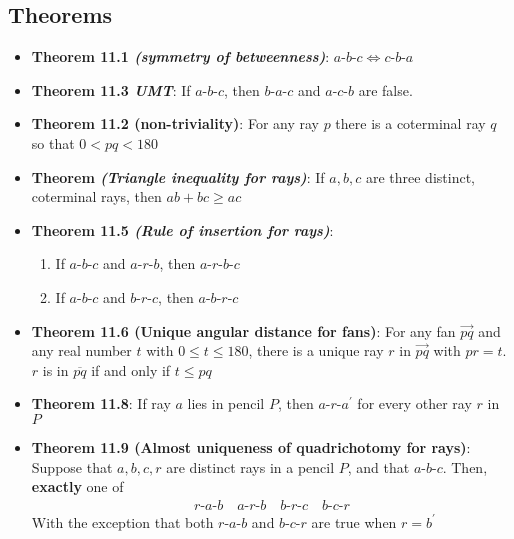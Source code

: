 \documentclass{report}
\begin{document}
    \pagebreak 
    \subsection{Theorems}
    \begin{itemize}
        \item \textbf{Theorem 11.1 \textit{(symmetry of betweenness)}}: $ a\text{-}b\text{-}c \iff c\text{-}b\text{-}a$
        \item \textbf{Theorem 11.3 \textit{UMT}}: If $ a\text{-}b\text{-}c$, then $ b\text{-}a\text{-}c$ and $ a\text{-}c\text{-}b$ are false.
        \item \textbf{Theorem 11.2 (non-triviality)}: For any ray $p$ there is a coterminal ray $q$ so that $0 < pq < 180$
        \item \textbf{Theorem \textit{(Triangle inequality for rays)}}: If $a,b,c$ are three distinct, coterminal rays, then $ab + bc \geq ac$
        \item \textbf{Theorem 11.5 \textit{(Rule of insertion for rays)}}:
            \begin{enumerate}[label=(\alph*)]
                \item If $ a\text{-}b\text{-}c$ and $ a\text{-}r\text{-}b$, then $ a\text{-}r\text{-}b\text{-}c $
                \item If $ a\text{-}b\text{-}c $ and $ b\text{-}r\text{-}c $, then $ a\text{-}b\text{-}r\text{-}c $
            \end{enumerate}
        \item \textbf{Theorem 11.6 (Unique angular distance for fans)}: For any fan $\overrightarrow{pq}$ and any real number $t$ with $0 \leq t \leq 180$, there is a unique ray $r$ in $\overrightarrow{pq}$ with $pr = t$. $r$ is in $\overline{pq} $ if and only if $t \leq  pq$
        \item \textbf{Theorem 11.8}: If ray $a$ lies in pencil $P$, then $ a\text{-}r\text{-}a^{\prime} $ for every other ray $r$ in $P$
        \item \textbf{Theorem 11.9 (Almost uniqueness of quadrichotomy for rays)}: Suppose that $a,b,c,r$ are distinct rays in a pencil $P$, and that $ a\text{-}b\text{-}c$. Then, \textbf{exactly} one of 
            \begin{align*}
                r\text{-}a\text{-}b \quad a\text{-}r\text{-}b \quad b\text{-}r\text{-}c \quad b\text{-}c\text{-}r
            \end{align*}
            With the exception that both $ r\text{-}a\text{-}b $ and $ b\text{-}c\text{-}r$ are true when $r = b^{\prime} $

\end{itemize}
\end{document}
